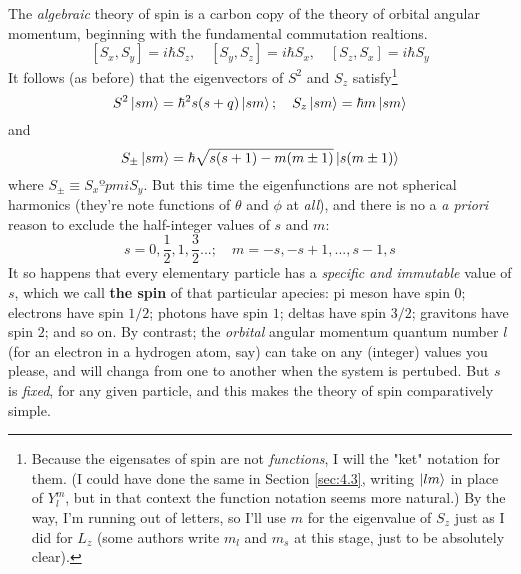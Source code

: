 The \textit{algebraic} theory of spin is a carbon copy of the theory of orbital angular momentum, beginning with the fundamental commutation realtions.
\begin{equation}\label{4.124}
	[S_x,S_y]=i\hbar S_z,\quad [S_y,S_z]=i\hbar S_x,\quad [S_z,S_x]=i\hbar S_y
\end{equation}
It follows (as before) that the eigenvectors of $S^2$ and $S_z$ satisfy\footnote{Because the eigensates of spin are not \textit{functions}, I will the "ket" notation for them. (I could have done the same in Section \ref{sec:4.3}, writing $\ket{lm}$ in place of $Y_l^m$, but in that context the function notation seems more natural.) By the way, I'm running out of letters,  so I'll use $m$ for the eigenvalue of $S_z$ just as I did for $L_z$ (some authors write $m_l$ and $m_s$ at this stage, just to be absolutely clear).}
\begin{equation}\label{4.135}
	S^2\ket{sm}=\hbar^2s(s+q)\ket{sm};\quad S_z\ket{sm}=\hbar m\ket{sm}
\end{equation}
and 
\begin{equation}\label{4.136}
	S_{\pm}\ket{sm}=\hbar\sqrt{s(s+1)-m(m\pm 1)}\ket{s(m\pm 1)}
\end{equation}
where $S_{\pm}\equiv S_xºpm iS_y$. But this time the eigenfunctions are not spherical harmonics (they're note functions of $\theta$ and $\phi$ at \textit{all}), and there is no a \textit{a priori} reason to exclude the half-integer values of $s$ and $m$:
\begin{equation}\label{4.137}
	s = 0,\frac{1}{2},1,\frac{3}{2}...;\quad m=-s, -s+1,...,s-1,s
\end{equation}
It so happens that every elementary particle has a \textit{specific and immutable} value of $s$, which we call \textbf{the spin} of that particular apecies: pi meson have spin $0$; electrons have spin $1/2$; photons have spin $1$; deltas have spin $3/2$; gravitons have spin $2$; and so on. By contrast; the \textit{orbital} angular momentum quantum number $l$ (for an electron in a hydrogen atom, say) can take on any (integer) values you please, and will changa from one to another when the system is pertubed. But $s$ is \textit{fixed}, for any given particle, and this makes the theory of spin comparatively simple.

